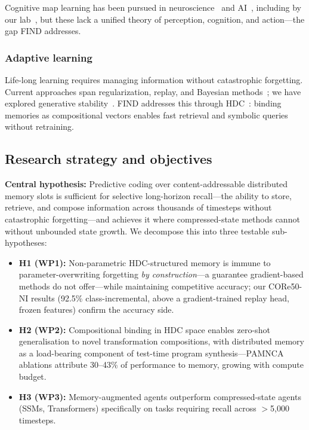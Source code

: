 Cognitive map learning has been pursued in neuroscience~\cite{hafting2005grid} and AI~\cite{whittington2020tolman}, including by our lab~\cite{schoyen2023coherently,pettersen2024elife,pettersen2024nips,schoyen2025plos}, but these lack a unified theory of perception, cognition, and action---the gap FIND addresses.

\subsubsection*{Adaptive learning}

Life-long learning requires managing information without catastrophic forgetting. Current approaches span regularization, replay, and Bayesian methods~\cite{wang2024comprehensive,nguyen2017vcl}; we have explored generative stability~\cite{wasiluk2023genreplay}. FIND addresses this through HDC~\cite{kanerva2009hyperdimensional}: binding memories as compositional vectors enables fast retrieval and symbolic queries without retraining.

\subsection{Research strategy and objectives}

\textbf{Central hypothesis:} Predictive coding over content-addressable distributed memory slots is sufficient for selective long-horizon recall---the ability to store, retrieve, and compose information across thousands of timesteps without catastrophic forgetting---and achieves it where compressed-state methods cannot without unbounded state growth. We decompose this into three testable sub-hypotheses:
\begin{itemize}[noitemsep,topsep=2pt]
  \item \textbf{H1 (WP1):} Non-parametric HDC-structured memory is immune to parameter-overwriting forgetting \textit{by construction}---a guarantee gradient-based methods do not offer---while maintaining competitive accuracy; our CORe50-NI results (92.5\% class-incremental, above a gradient-trained replay head, frozen features) confirm the accuracy side.
  \item \textbf{H2 (WP2):} Compositional binding in HDC space enables zero-shot generalisation to novel transformation compositions, with distributed memory as a load-bearing component of test-time program synthesis---PAMNCA ablations attribute 30--43\% of performance to memory, growing with compute budget.
  \item \textbf{H3 (WP3):} Memory-augmented agents outperform compressed-state agents (SSMs, Transformers) specifically on tasks requiring recall across $>$5,000 timesteps.
\end{itemize}

